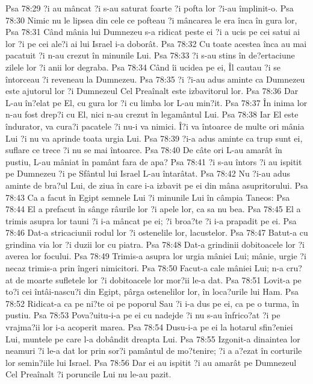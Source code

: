 Psa 78:29  ?i au mâncat ?i s-au saturat foarte ?i pofta lor ?i-au împlinit-o.
Psa 78:30  Nimic nu le lipsea din cele ce pofteau ?i mâncarea le era înca în gura lor,
Psa 78:31  Când mânia lui Dumnezeu s-a ridicat peste ei ?i a ucis pe cei satui ai lor ?i pe cei ale?i ai lui Israel i-a doborât.
Psa 78:32  Cu toate acestea înca au mai pacatuit ?i n-au crezut în minunile Lui.
Psa 78:33  ?i s-au stins în de?ertaciune zilele lor ?i anii lor degraba.
Psa 78:34  Când îi ucidea pe ei, Îl cautau ?i se întorceau ?i reveneau la Dumnezeu.
Psa 78:35  ?i ?i-au adus aminte ca Dumnezeu este ajutorul lor ?i Dumnezeul Cel Preaînalt este izbavitorul lor.
Psa 78:36  Dar L-au în?elat pe El, cu gura lor ?i cu limba lor L-au min?it.
Psa 78:37  În inima lor n-au fost drep?i cu El, nici n-au crezut în legamântul Lui.
Psa 78:38  Iar El este îndurator, va cura?i pacatele ?i nu-i va nimici. Î?i va întoarce de multe ori mânia Lui ?i nu va aprinde toata urgia Lui.
Psa 78:39  ?i-a adus aminte ca trup sunt ei, suflare ce trece ?i nu se mai întoarce.
Psa 78:40  De câte ori L-au amarât în pustiu, L-au mâniat în pamânt fara de apa?
Psa 78:41  ?i s-au întors ?i au ispitit pe Dumnezeu ?i pe Sfântul lui Israel L-au întarâtat.
Psa 78:42  Nu ?i-au adus aminte de bra?ul Lui, de ziua în care i-a izbavit pe ei din mâna asupritorului.
Psa 78:43  Ca a facut în Egipt semnele Lui ?i minunile Lui în câmpia Taneos:
Psa 78:44  El a prefacut în sânge râurile lor ?i apele lor, ca sa nu bea.
Psa 78:45  El a trimis asupra lor tauni ?i i-a mâncat pe ei; ?i broa?te ?i i-a prapadit pe ei.
Psa 78:46  Dat-a stricaciunii rodul lor ?i ostenelile lor, lacustelor.
Psa 78:47  Batut-a cu grindina via lor ?i duzii lor cu piatra.
Psa 78:48  Dat-a grindinii dobitoacele lor ?i averea lor focului.
Psa 78:49  Trimis-a asupra lor urgia mâniei Lui; mânie, urgie ?i necaz trimis-a prin îngeri nimicitori.
Psa 78:50  Facut-a cale mâniei Lui; n-a cru?at de moarte sufletele lor ?i dobitoacele lor mor?ii le-a dat.
Psa 78:51  Lovit-a pe to?i cei întâi-nascu?i din Egipt, pârga ostenelilor lor, în loca?urile lui Ham.
Psa 78:52  Ridicat-a ca pe ni?te oi pe poporul Sau ?i i-a dus pe ei, ca pe o turma, în pustiu.
Psa 78:53  Pova?uitu-i-a pe ei cu nadejde ?i nu s-au înfrico?at ?i pe vrajma?ii lor i-a acoperit marea.
Psa 78:54  Dusu-i-a pe ei la hotarul sfin?eniei Lui, muntele pe care l-a dobândit dreapta Lui.
Psa 78:55  Izgonit-a dinaintea lor neamuri ?i le-a dat lor prin sor?i pamântul de mo?tenire; ?i a a?ezat în corturile lor semin?iile lui Israel.
Psa 78:56  Dar ei au ispitit ?i au amarât pe Dumnezeul Cel Preaînalt ?i poruncile Lui nu le-au pazit.
